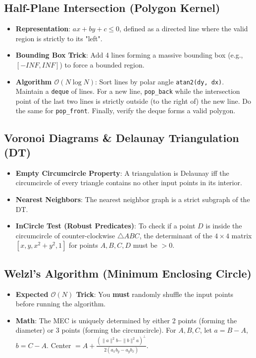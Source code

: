 \documentclass[12pt]{article}
\begin{document}
\subsection{Half-Plane Intersection (Polygon Kernel)}
\begin{itemize}
    \item \textbf{Representation}: $ax + by + c \le 0$, defined as a directed line where the valid region is strictly to its "left".
    \item \textbf{Bounding Box Trick}: Add 4 lines forming a massive bounding box (e.g., $[-INF, INF]$) to force a bounded region.
    \item \textbf{Algorithm $\mathcal{O}(N \log N)$}: Sort lines by polar angle \texttt{atan2(dy, dx)}. Maintain a \texttt{deque} of lines. For a new line, \texttt{pop\_back} while the intersection point of the last two lines is strictly outside (to the right of) the new line. Do the same for \texttt{pop\_front}. Finally, verify the deque forms a valid polygon.
\end{itemize}

\subsection{Voronoi Diagrams \& Delaunay Triangulation (DT)}
\begin{itemize}
    \item \textbf{Empty Circumcircle Property}: A triangulation is Delaunay iff the circumcircle of every triangle contains no other input points in its interior.
    \item \textbf{Nearest Neighbors}: The nearest neighbor graph is a strict subgraph of the DT.
    \item \textbf{InCircle Test (Robust Predicates)}: To check if a point $D$ is inside the circumcircle of counter-clockwise $\triangle ABC$, the determinant of the $4 \times 4$ matrix $[x, y, x^2+y^2, 1]$ for points $A, B, C, D$ must be $> 0$.
\end{itemize}

\subsection{Welzl's Algorithm (Minimum Enclosing Circle)}
\begin{itemize}
    \item \textbf{Expected $\mathcal{O}(N)$ Trick}: You \textbf{must} randomly shuffle the input points before running the algorithm.
    \item \textbf{Math}: The MEC is uniquely determined by either 2 points (forming the diameter) or 3 points (forming the circumcircle). For $A, B, C$, let $a = B-A$, $b = C-A$. Center $= A + \frac{(\|a\|^2 b - \|b\|^2 a)^\perp}{2 (a_x b_y - a_y b_x)}$.
\end{itemize}
\end{document}
